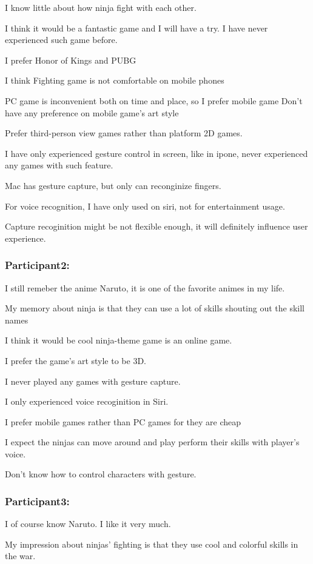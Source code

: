 \documentclass[UTF8,a4paper,12pt]{ctexart}
\numberwithin{equation}{section}
\begin{document}
I know little about how ninja fight with each other.

I think it would be a fantastic game and I will have a try. I have never experienced such game before.

I prefer Honor of Kings and PUBG

I think Fighting game is not comfortable on mobile phones

PC game is inconvenient both on time and place, so I prefer mobile game
Don't have any preference on mobile game's art style

Prefer third-person view games rather than platform 2D games.

I have only experienced gesture control in screen, like in ipone, never experienced any games with such feature.

Mac has gesture capture, but only can reconginize fingers.

For voice recognition, I have only used on siri, not for entertainment usage.

Capture recoginition might be not flexible enough, it will definitely influence user experience.

\subsubsection*{Participant2:} 
I still remeber the anime Naruto, it is one of the favorite animes in my life.

My memory about ninja is that they can use a lot of skills shouting out the skill names

I think it would be cool ninja-theme game is an online game.

I prefer the game's art style to be 3D.

I never played any games with gesture capture.

I only experienced voice recoginition in Siri.

I prefer mobile games rather than PC games for they are cheap

I expect the ninjas can move around and play perform their skills with player's voice.

Don't know how to control characters with gesture.

\subsubsection*{Participant3:} 
I of course know Naruto. I like it very much.

My impression about ninjas' fighting is that they use cool and colorful skills in the war.
\end{document}
